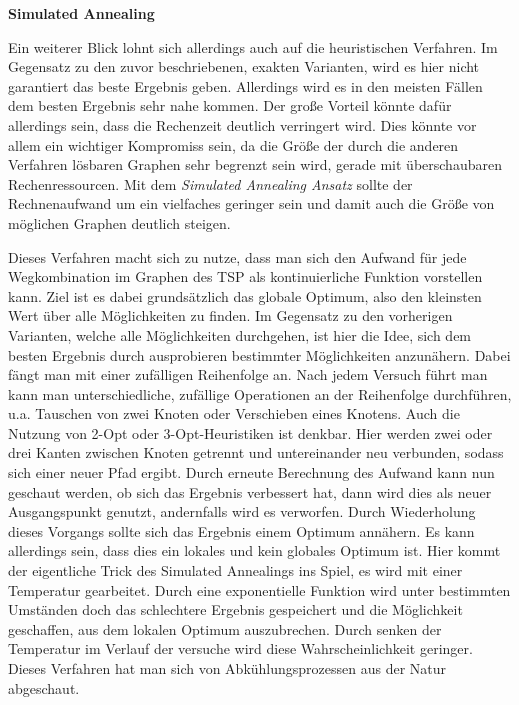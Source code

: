 \textbf{Simulated Annealing}

Ein weiterer Blick lohnt sich allerdings auch auf die heuristischen Verfahren. Im Gegensatz zu den zuvor beschriebenen, exakten Varianten, wird es hier nicht garantiert das beste Ergebnis geben. Allerdings wird es in den meisten Fällen dem besten Ergebnis sehr nahe kommen. Der große Vorteil könnte dafür allerdings sein, dass die Rechenzeit deutlich verringert wird. Dies könnte vor allem ein wichtiger Kompromiss sein, da die Größe der durch die anderen Verfahren lösbaren Graphen sehr begrenzt sein wird, gerade mit überschaubaren Rechenressourcen. Mit dem \textit{Simulated Annealing Ansatz} sollte der Rechnenaufwand um ein vielfaches geringer sein und damit auch die Größe von möglichen Graphen deutlich steigen. \cite{tspSimulatedAnnealing}

Dieses Verfahren macht sich zu nutze, dass man sich den Aufwand für jede Wegkombination im Graphen des TSP als kontinuierliche Funktion vorstellen kann. Ziel ist es dabei grundsätzlich das globale Optimum, also den kleinsten Wert über alle Möglichkeiten zu finden. Im Gegensatz zu den vorherigen Varianten, welche alle Möglichkeiten durchgehen, ist hier die Idee, sich dem besten Ergebnis durch ausprobieren bestimmter Möglichkeiten anzunähern. Dabei fängt man mit einer zufälligen Reihenfolge an. Nach jedem Versuch führt man kann man unterschiedliche, zufällige Operationen an der Reihenfolge durchführen, u.a. Tauschen von zwei Knoten oder Verschieben eines Knotens. Auch die Nutzung von 2-Opt oder 3-Opt-Heuristiken ist denkbar. Hier werden zwei oder drei Kanten zwischen Knoten getrennt und untereinander neu verbunden, sodass sich einer neuer Pfad ergibt. Durch erneute Berechnung des Aufwand kann nun geschaut werden, ob sich das Ergebnis verbessert hat, dann wird dies als neuer Ausgangspunkt genutzt, andernfalls wird es verworfen. Durch Wiederholung dieses Vorgangs sollte sich das Ergebnis einem Optimum annähern. Es kann allerdings sein, dass dies ein lokales und kein globales Optimum ist. Hier kommt der eigentliche Trick des Simulated Annealings ins Spiel, es wird mit einer \glqq{}Temperatur\grqq{} gearbeitet. Durch eine exponentielle Funktion wird unter bestimmten Umständen doch das schlechtere Ergebnis gespeichert und die Möglichkeit geschaffen, aus dem lokalen Optimum auszubrechen. Durch senken der Temperatur im Verlauf der versuche wird diese Wahrscheinlichkeit geringer. Dieses Verfahren hat man sich von Abkühlungsprozessen aus der Natur abgeschaut. \cite{tspSimulatedAnnealing}

